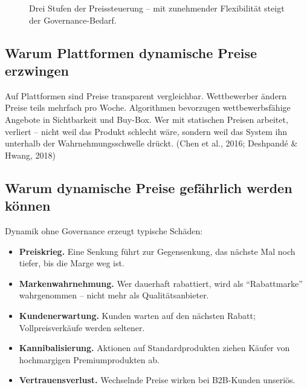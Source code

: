\documentclass[11pt,a4paper,oneside]{article}
\newcommand{\quelle}[1]{{\footnotesize\color{lpGray}(#1)}}
\begin{document}
\begin{figure}[h]
\centering
{}
\caption{\sffamily Drei Stufen der Preissteuerung -- mit zunehmender Flexibilität steigt der Governance-Bedarf.}
\label{fig:preisstufen-22t08}
\end{figure}

\subsection{Warum Plattformen dynamische Preise erzwingen}

Auf Plattformen sind Preise transparent vergleichbar. Wettbewerber ändern Preise teils mehrfach pro Woche. Algorithmen bevorzugen wettbewerbsfähige Angebote in Sichtbarkeit und Buy-Box. Wer mit statischen Preisen arbeitet, verliert -- nicht weil das Produkt schlecht wäre, sondern weil das System ihn unterhalb der Wahrnehmungsschwelle drückt. \quelle{Chen et al., 2016; Deshpandé \& Hwang, 2018}

\subsection{Warum dynamische Preise gefährlich werden können}

Dynamik ohne Governance erzeugt typische Schäden:

\begin{itemize}
  \item \textbf{Preiskrieg.} Eine Senkung führt zur Gegensenkung, das nächste Mal noch tiefer, bis die Marge weg ist.
  \item \textbf{Markenwahrnehmung.} Wer dauerhaft rabattiert, wird als ``Rabattmarke'' wahrgenommen -- nicht mehr als Qualitätsanbieter.
  \item \textbf{Kundenerwartung.} Kunden warten auf den nächsten Rabatt; Vollpreisverkäufe werden seltener.
  \item \textbf{Kannibalisierung.} Aktionen auf Standardprodukten ziehen Käufer von hochmargigen Premiumprodukten ab.
  \item \textbf{Vertrauensverlust.} Wechselnde Preise wirken bei B2B-Kunden unseriös.
\end{itemize}
\end{document}
